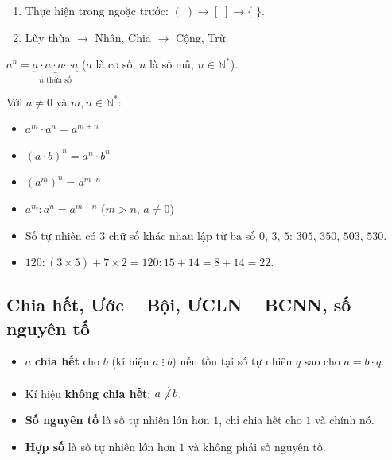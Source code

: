 \documentclass[12pt,a4paper]{article}
\begin{document}
\begin{phuongphap}[title={Thứ tự thực hiện phép tính}]
\begin{enumerate}
  \item Thực hiện trong ngoặc trước: $(\;) \to [\;] \to \{\;\}$.
  \item Lũy thừa $\to$ Nhân, Chia $\to$ Cộng, Trừ.
\end{enumerate}
\end{phuongphap}

\begin{dinhnghia}[title={Lũy thừa}]
$a^n = \underbrace{a \cdot a \cdot a \cdots a}_{n \text{ thừa số}}$ \quad ($a$ là cơ số, $n$ là số mũ, $n \in \mathbb{N}^{*}$).
\end{dinhnghia}

\begin{tinhchat}[title={Tính chất của lũy thừa}]
Với $a \ne 0$ và $m, n \in \mathbb{N}^{*}$:
\begin{itemize}
  \item $a^m \cdot a^n = a^{m+n}$
  \item $(a \cdot b)^n = a^n \cdot b^n$
  \item $(a^m)^n = a^{m \cdot n}$
  \item $a^m : a^n = a^{m-n}$ \quad ($m > n$, $a \ne 0$)
\end{itemize}
\end{tinhchat}

\begin{vidu}
\begin{itemize}
  \item Số tự nhiên có 3 chữ số khác nhau lập từ ba số $0$, $3$, $5$: $305$, $350$, $503$, $530$.
  \item $120 : (3 \times 5) + 7 \times 2 = 120 : 15 + 14 = 8 + 14 = 22$.
\end{itemize}
\end{vidu}

\subsection{Chia hết, Ước -- Bội, ƯCLN -- BCNN, số nguyên tố}

\begin{dinhnghia}
\begin{itemize}
  \item $a$ \textbf{chia hết} cho $b$ (kí hiệu $a \mathrel{\vdots} b$) nếu tồn tại số tự nhiên $q$ sao cho $a = b \cdot q$.
  \item Kí hiệu \textbf{không chia hết}: $a \mathrel{\not\vdots} b$.
  \item \textbf{Số nguyên tố} là số tự nhiên lớn hơn $1$, chỉ chia hết cho $1$ và chính nó.
  \item \textbf{Hợp số} là số tự nhiên lớn hơn $1$ và không phải số nguyên tố.
\end{itemize}
\end{dinhnghia}
\end{document}
